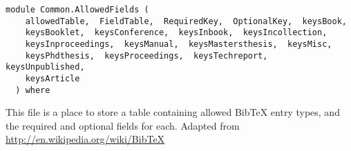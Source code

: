 \label{module:Common.AllowedFields}
\haddockbeginheader
{\haddockverb\begin{verbatim}
module Common.AllowedFields (
    allowedTable,  FieldTable,  RequiredKey,  OptionalKey,  keysBook, 
    keysBooklet,  keysConference,  keysInbook,  keysIncollection, 
    keysInproceedings,  keysManual,  keysMastersthesis,  keysMisc, 
    keysPhdthesis,  keysProceedings,  keysTechreport,  keysUnpublished, 
    keysArticle
  ) where\end{verbatim}}
\haddockendheader

This file is a place to store a table containing allowed BibTeX entry types,
 and the required and optional fields for each. 
 Adapted from \url{http://en.wikipedia.org/wiki/BibTeX}
\par

